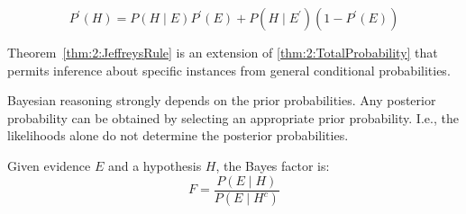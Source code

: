 \begin{thm}
  \label{thm:2:JeffreysRule}
  \begin{equation}
    \label{eqn:2:JeffreysRule}
    P^\prime(H) = P(H \mid E) P^\prime(E) + P(H \mid E^\prime) (1 - P^\prime(E))
  \end{equation}
\end{thm}

Theorem~\ref{thm:2:JeffreysRule}
is an extension of \ref{thm:2:TotalProbability} that permits inference about
specific instances from general conditional probabilities.

Bayesian reasoning strongly depends on the prior probabilities.
Any posterior probability can be obtained by selecting an appropriate prior
probability.
I.e., the likelihoods alone do not determine the posterior probabilities.

\begin{dfn}
  \label{def:2:BayesFactor}

  Given evidence $E$ and a hypothesis $H$, the Bayes factor is:
  \begin{equation}
    \label{eqn:2:BayesFactor}
    F = \frac{P(E \mid H)}{P(E \mid H^c)}
  \end{equation}
\end{dfn}
